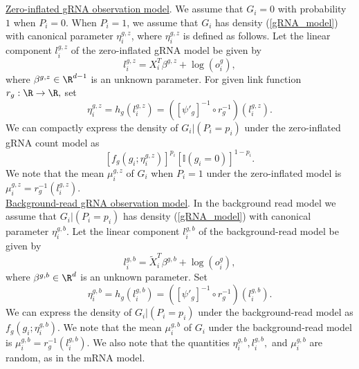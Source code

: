 \documentclass[12pt]{article}
\begin{document}
\\ \\ \noindent
\underline{Zero-inflated gRNA observation model}. We assume that $G_i = 0$ with probability $1$ when $P_i = 0$. When $P_i = 1$, we assume that $G_i$ has density (\ref{gRNA_model}) with canonical parameter $\eta_i^{g,z}$, where $\eta_i^{g,z}$ is defined as follows. Let the linear component $l^{g,z}_i$ of the zero-inflated gRNA model be given by
$$ l^{g,z}_i = X_i^T \beta^{g,z} + \log(o^g_i),$$ where $\beta^{g,z} \in \R^{d-1}$ is an unknown parameter. For given link function $r_g : \R \to \R,$ set $$\eta^{g, z}_i = h_{g} (l^{g,z}_i) = ([\psi'_g]^{-1} \circ r_g^{-1})(l_i^{g,z}).$$ We can compactly express the density of $G_i | (P_i = p_i)$ under the zero-inflated gRNA count model as
$$ \left[ f_g(g_i; \eta^{g,z}_i) \right]^{p_i} \left[ \mathbb{I}(g_i = 0) \right]^{1 - p_i}.$$ We note that the mean $\mu^{g,z}_i$ of $G_i$ when $P_i = 1$ under the zero-inflated model is $\mu^{g,z}_i = r_g^{-1}(l_i^{g,z})$. 
\\ \noindent
\underline{Background-read gRNA observation model}. In the background read model we assume that $G_i | (P_i = p_i)$ has density (\ref{gRNA_model}) with canonical parameter $\eta_i^{g,b}$. Let the linear component $l_i^{g,b}$ of the background-read model be given by
$$ l^{g,b}_i = \tilde{X}^T_i \beta^{g,b} + \log(o_i^g),$$ where $\beta^{g,b} \in \R^d$ is an unknown parameter. Set
$$ \eta_i^{g,b} = h_g(l_i^{g,b}) = ([\psi'_g ]^{-1} \circ r_g^{-1}) (l_i^{g,b}).$$ We can express the density of $G_i | (P_i = p_i)$ under the background-read model as $f_g( g_i ; \eta_i^{g,b}).$ We note that the mean $\mu^{g,b}_i$ of $G_i$ under the background-read model is $\mu^{g,b}_i = r^{-1}_g(l_i^{g,b}).$ We also note that the quantities $ \eta_i^{g,b}, l_i^{g,b},$ and $\mu_i^{g,b}$ are random, as in the mRNA model.
\end{document}

